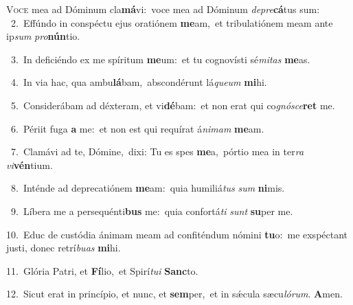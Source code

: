 \lettrine{\initial\textcolor{\initialcolor}{V}}{oce} mea ad Dóminum cla\-\textbf{má}\-vi:~\star voce mea ad Dóminum \textit{de}\-\textit{pre}\textbf{cá}tus sum:\\
{\numbfont\textcolor{\numbcolor}{~2.}}~Effúndo in conspéctu ejus oratiónem \textbf{me}\-am,~\star et tribulatiónem meam ante ip\textit{sum} \textit{pro}\-\textbf{nún}tio.\par
{\numbfont\textcolor{\numbcolor}{~3.}}~In deficiéndo ex me spíritum \textbf{me}\-um:~\star et tu cognovísti sé\-\textit{mi}\-\textit{tas} \textbf{me}\-as.\par
{\numbfont\textcolor{\numbcolor}{~4.}}~In via hac, qua ambu\-\textbf{lá}\-bam,~\star abscondérunt lá\-\textit{que}\-\textit{um} \textbf{mi}\-hi.\par
{\numbfont\textcolor{\numbcolor}{~5.}}~Considerábam ad déxteram, et vi\-\textbf{dé}\-bam:~\star et non erat qui co\-\textit{gnó}\-\textit{sce}\textbf{ret} me.\par
{\numbfont\textcolor{\numbcolor}{~6.}}~Périit fuga \textbf{a} me:~\star et non est qui requírat á\-\textit{ni}\-\textit{mam} \textbf{me}\-am.\par
{\numbfont\textcolor{\numbcolor}{~7.}}~Clamávi ad te, Dómine,~\dagger dixi: Tu es spes \textbf{me}\-a,~\star pórtio mea in ter\textit{ra} \textit{vi}\-\textbf{vén}tium.\par
{\numbfont\textcolor{\numbcolor}{~8.}}~Inténde ad deprecatiónem \textbf{me}\-am:~\star quia humiliá\textit{tus} \textit{sum} \textbf{ni}\-mis.\par
{\numbfont\textcolor{\numbcolor}{~9.}}~Líbera me a persequénti\textbf{bus} me:~\star quia confortá\textit{ti} \textit{sunt} \textbf{su}\-per me.\par
{\numbfont\textcolor{\numbcolor}{10.}}~Educ de custódia ánimam meam ad confiténdum nómini \textbf{tu}\-o:~\star me exspéctant justi, donec retrí\-\textit{bu}\-\textit{as} \textbf{mi}\-hi.\par
{\numbfont\textcolor{\numbcolor}{11.}}~Glória Patri, et \textbf{Fí}\-lio,~\star et Spirí\-\textit{tu}\-\textit{i} \textbf{Sanc}\-to.\par
{\numbfont\textcolor{\numbcolor}{12.}}~Sicut erat in princípio, et nunc, et \textbf{sem}\-per,~\star et in sǽcula sæcu\-\textit{ló}\-\textit{rum}. \textbf{A}\-men.\par
